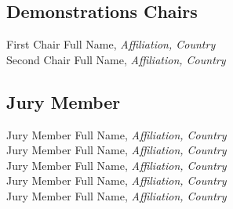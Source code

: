 
\subsection{Demonstrations Chairs}
First Chair Full Name, \emph{Affiliation, Country}\\
Second Chair Full Name, \emph{Affiliation, Country}



\subsection{Jury Member}
Jury Member Full Name, \emph{Affiliation, Country}\\
Jury Member Full Name, \emph{Affiliation, Country}\\
Jury Member Full Name, \emph{Affiliation, Country}\\
Jury Member Full Name, \emph{Affiliation, Country}\\
Jury Member Full Name, \emph{Affiliation, Country}\\

